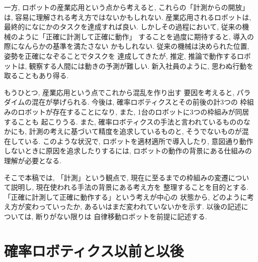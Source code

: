 \documentclass[twocolumn]{jarticle} %
\begin{document}
一方, ロボットの産業応用という点から考えると, 
これらの「計測からの開放」は, 
容易に理解される考え方ではないかもしれない. 
産業応用されるロボットは, 
最終的になにかのタスクを達成すれば良い. しかしその過程において, 
従来の機械のように「正確に計測して正確に動作」
することを過度に期待すると, 導入の際になんらかの基準を満たさない
かもしれない. 
従来の機械は決められた位置, 姿勢を正確になぞることでタスクを
達成してきたが, 推定, 推論で動作するロボットは, 
観察する人間には動きの予測が難しい. 
新入社員のように, 思わぬ行動を取ることもあり得る. 



もうひとつ, 産業応用という点でこれから混乱を作り出す
要因を考えると, パラダイムの混在が挙げられる. 
今後は, 確率ロボティクスとその前後の計3つの
枠組みのロボットが存在することになり, 
また, 1台のロボットに3つの枠組みが同居することも
起こりうる. 
また, 確率ロボティクスの手法と言われているもののなかにも, 
計測の考えに基づいて精度を追求しているものと, 
そうでないものが混在している. 
このような状況で, 
ロボットを適材適所で導入したり, 
意図通り動作しないときに原因を追求したりするには, 
ロボットの動作の背景にある仕組みの理解が必要となる. 




そこで本稿では, 「計測」という観点で, 
現在に至るまでの枠組みの変遷について説明し, 
現在使われる手法の背景にある考え方を
整理することを目的とする. 
「正確に計測して正確に動作する」という考えが中心の
状態から, どのように考え方が変わっていったか, 
あるいはまだ変われていないかを示す. 
以後の記述については, 断りがない限りは
自律移動ロボットを前提に記述する. 


\section{確率ロボティクス以前と以後}
\end{document}
